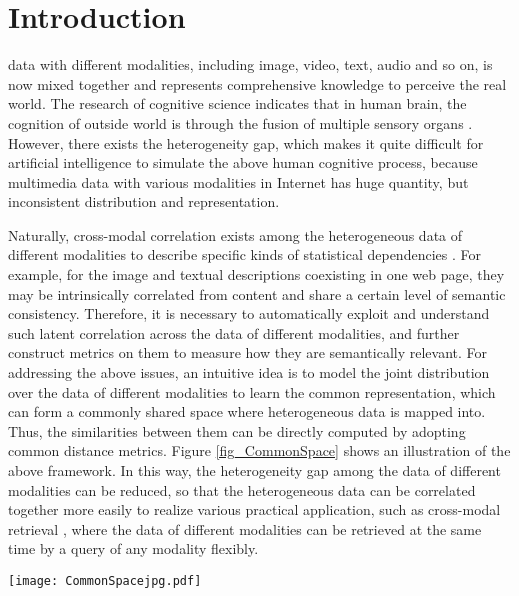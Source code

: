 \documentclass[journal]{IEEEtran}
\begin{document}
\IEEEpeerreviewmaketitle



\section{Introduction}



 data with different modalities, including image, video, text, audio and so on, is now mixed together and represents comprehensive knowledge to perceive the real world. The research of cognitive science indicates that in human brain, the cognition of outside world is through the fusion of multiple sensory organs \cite{mcgurk1976hearing}. However, there exists the heterogeneity gap, which makes it quite difficult for artificial intelligence to simulate the above human cognitive process, because multimedia data with various modalities in Internet has huge quantity, but inconsistent distribution and representation. 

Naturally, cross-modal correlation exists among the heterogeneous data of different modalities to describe specific kinds of statistical dependencies \cite{peng2017cross}. For example, for the image and textual descriptions coexisting in one web page, they may be intrinsically correlated from content and share a certain level of semantic consistency. 
Therefore, it is necessary to automatically exploit and understand such latent correlation across the data of different modalities, and further construct metrics on them to measure how they are semantically relevant. For addressing the above issues, an intuitive idea is to model the joint distribution over the data of different modalities to learn the common representation, which can form a commonly shared space where heterogeneous data is mapped into. Thus, the similarities between them can be directly computed by adopting common distance metrics. Figure \ref{fig_CommonSpace} shows an illustration of the above framework. In this way, the heterogeneity gap among the data of different modalities can be reduced, so that the heterogeneous data can be correlated together more easily to realize various practical application, such as cross-modal retrieval \cite{peng2017overview}, where the data of different modalities can be retrieved at the same time by a query of any modality flexibly.

\begin{figure*}[!t]
	\centering
	\texttt{[image: CommonSpacejpg.pdf]}
	\caption{Illustrations of mainstream framework for constructing the cross-modal correlation learning, which aims to project the heterogeneous data of different modalities from their own feature spaces into one common space, where similarity measurement can be directly adopted to establish correlation on the cross-modal data.
	}
	\label{fig_CommonSpace}
\end{figure*}
\end{document}
